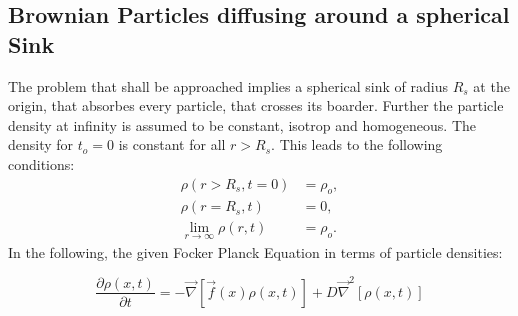 \subsection{Brownian Particles diffusing around a spherical Sink}

The problem that shall be approached implies a spherical sink of radius $R_s$ at the origin, that absorbes every particle, that crosses its boarder. Further the particle density at infinity is assumed to be constant, isotrop and homogeneous. The density for $t_o = 0$ is constant for all $r > R_s$. 
This leads to the following conditions:
\begin{align}
    \rho(r > R_s, t = 0) &= \rho_o, \\
    \rho(r=R_s,t) &= 0, \\
    \lim_{r \rightarrow \infty} \rho(r, t) &= \rho_o.
    \label{BC}
\end{align}
In the following, the given Focker Planck Equation in terms of particle densities:

\begin{equation}
        \frac{\partial \rho(x,t)}{\partial t} = - \vec \nabla \left[ \vec f(x)\rho(x,t) \right] + D\vec \nabla ^2 \left[\rho(x,t) \right] 
    \label{FPE3}
\end{equation}

